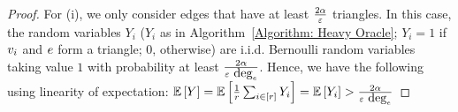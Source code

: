 \begin{proof}
    For (i), we only consider edges that have at least $\frac{2\alpha}{\varepsilon}$ triangles. In this case, the random variables $Y_i$ ($Y_i$ as in Algorithm~\ref{Algorithm: Heavy Oracle}; $Y_i=1$ if $v_i$ and $e$ form a triangle; $0$, otherwise) are i.i.d. Bernoulli random variables taking value $1$ with probability at least $\frac{2\alpha}{\varepsilon ~ \mbox{deg}_{e}}$. Hence, we have the following using linearity of expectation:  
    $\operatorname*{\mathbb{E}}\left[{Y}\right] = \operatorname*{\mathbb{E}}\left[{\frac{1}{r}\sum_{i \in \left[{r}\right]} Y_i}\right] = \operatorname*{\mathbb{E}}\left[{Y_i}\right] > \frac{2\alpha}{\varepsilon ~ \mbox{deg}_{e}} $
    

\end{proof}
